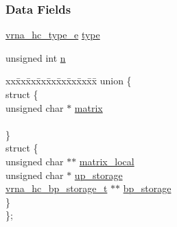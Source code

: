 \subsubsection*{Data Fields}
\begin{DoxyCompactItemize}
\item 
\mbox{\hyperlink{constraints__hard_8h_a0fcb8bda9b3712e14f8f513def112435}{vrna\+\_\+hc\+\_\+type\+\_\+e}} \mbox{\hyperlink{group__hard__constraints_a4b1666cfd4f6653832ae350dc5e52505}{type}}
\item 
unsigned int \mbox{\hyperlink{group__hard__constraints_ac5cedc9a5f819afe75bba2db712033c9}{n}}
\item 
\begin{tabbing}
xx\=xx\=xx\=xx\=xx\=xx\=xx\=xx\=xx\=\kill
union \{\\
\>struct \{\\
\>\>unsigned char $\ast$ \mbox{\hyperlink{group__hard__constraints_a6ff99f530ca7ca9719e164321d051bde}{matrix}}\\
\>\>\\
\>\} \\
\>struct \{\\
\>\>unsigned char $\ast$$\ast$ \mbox{\hyperlink{group__hard__constraints_a7a3a6e27f6a45447a6a3e4d294d0b90a}{matrix\_local}}\\
\>\>unsigned char $\ast$ \mbox{\hyperlink{group__hard__constraints_a83a7cae4063588b31be775724ffccff7}{up\_storage}}\\
\>\>\mbox{\hyperlink{structvrna__hc__bp__storage__t}{vrna\_hc\_bp\_storage\_t}} $\ast$$\ast$ \mbox{\hyperlink{group__hard__constraints_ab8760aed745e6d50e7982ff9a0c52ca9}{bp\_storage}}\\
\>\} \\
\}; \\


\end{tabbing}
\end{DoxyCompactItemize}
